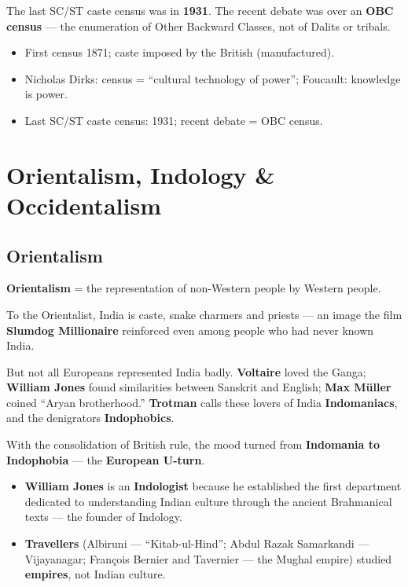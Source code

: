 \begin{DataFact}
The last SC/ST caste census was in \textbf{1931}. The recent debate was over an \textbf{OBC census} --- the enumeration of Other Backward Classes, not of Dalits or tribals.
\end{DataFact}

\begin{QuickRevision}
\begin{itemize}
\item First census 1871; caste imposed by the British (manufactured).
\item Nicholas Dirks: census = ``cultural technology of power''; Foucault: knowledge is power.
\item Last SC/ST caste census: 1931; recent debate = OBC census.
\end{itemize}
\end{QuickRevision}

\section{Orientalism, Indology \& Occidentalism}

\subsection{Orientalism}

\begin{KeyConcept}
\textbf{Orientalism} = the representation of non-Western people by Western people.
\end{KeyConcept}

To the Orientalist, India is caste, snake charmers and priests --- an image the film \textbf{Slumdog Millionaire} reinforced even among people who had never known India.

\begin{CriticalPoint}
But not all Europeans represented India badly. \textbf{Voltaire} loved the Ganga; \textbf{William Jones} found similarities between Sanskrit and English; \textbf{Max M\"uller} coined ``Aryan brotherhood.'' \textbf{Trotman} calls these lovers of India \textbf{Indomaniacs}, and the denigrators \textbf{Indophobics}.
\end{CriticalPoint}

With the consolidation of British rule, the mood turned from \textbf{Indomania to Indophobia} --- the \textbf{European U-turn}.

\begin{ComparisonBox}
\begin{itemize}
\item \textbf{William Jones} is an \textbf{Indologist} because he established the first department dedicated to understanding Indian culture through the ancient Brahmanical texts --- the founder of Indology.
\item \textbf{Travellers} (Albiruni --- ``Kitab-ul-Hind''; Abdul Razak Samarkandi --- Vijayanagar; Fran\c{c}ois Bernier and Tavernier --- the Mughal empire) studied \textbf{empires}, not Indian culture.
\end{itemize}
\end{ComparisonBox}

